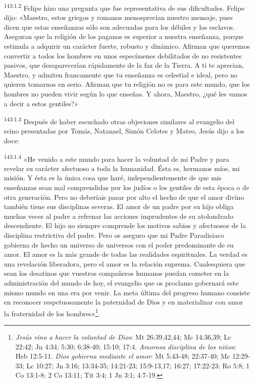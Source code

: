 \par
\textsuperscript{143:1.2} Felipe hizo una pregunta que fue representativa de sus dificultades. Felipe dijo: «Maestro, estos griegos y romanos menosprecian nuestro mensaje, pues dicen que estas enseñanzas sólo son adecuadas para los débiles y los esclavos. Aseguran que la religión de los paganos es superior a nuestra enseñanza, porque estimula a adquirir un carácter fuerte, robusto y dinámico. Afirman que queremos convertir a todos los hombres en unos especímenes debilitados de no resistentes pasivos, que desaparecerían rápidamente de la faz de la Tierra. A ti te aprecian, Maestro, y admiten francamente que tu enseñanza es celestial e ideal, pero no quieren tomarnos en serio. Afirman que tu religión no es para este mundo, que los hombres no pueden vivir según lo que enseñas. Y ahora, Maestro, ¿qué les vamos a decir a estos gentiles?»

\par
\textsuperscript{143:1.3} Después de haber escuchado otras objeciones similares al evangelio del reino presentadas por Tomás, Natanael, Simón Celotes y Mateo, Jesús dijo a los doce:

\par
\textsuperscript{143:1.4} «He venido a este mundo para hacer la voluntad de mi Padre y para revelar su carácter afectuoso a toda la humanidad. Ésta es, hermanos míos, mi misión. Y ésta es la única cosa que haré, independientemente de que mis enseñanzas sean mal comprendidas por los judíos o los gentiles de esta época o de otra generación. Pero no deberíais pasar por alto el hecho de que el amor divino también tiene sus disciplinas severas. El amor de un padre por su hijo obliga muchas veces al padre a refrenar las acciones imprudentes de su atolondrado descendiente. El hijo no siempre comprende los motivos sabios y afectuosos de la disciplina restrictiva del padre. Pero os aseguro que mi Padre Paradisiaco gobierna de hecho un universo de universos con el poder predominante de su amor. El amor es la más grande de todas las realidades espirituales. La verdad es una revelación liberadora, pero el amor es la relación suprema. Cualesquiera que sean los desatinos que vuestros compañeros humanos puedan cometer en la administración del mundo de hoy, el evangelio que os proclamo gobernará este mismo mundo en una era por venir. La meta última del progreso humano consiste en reconocer respetuosamente la paternidad de Dios y en materializar con amor la fraternidad de los hombres»\footnote{\textit{Jesús vino a hacer la voluntad de Dios}: Mt 26:39,42,44; Mc 14:36,39; Lc 22:42; Jn 4:34; 5:30; 6:38-40; 15:10; 17:4. \textit{Amorosa disciplina de los niños}: Heb 12:5-11. \textit{Dios gobierna mediante el amor}: Mt 5:43-48; 22:37-40; Mc 12:29-33; Lc 10:27; Jn 3:16; 13:34-35; 14:21-23; 15:9-13,17; 16:27; 17:22-23; Ro 5:8; 1 Co 13:1-8; 2 Co 13:11; Tit 3:4; 1 Jn 3:1; 4:7-19.}.

